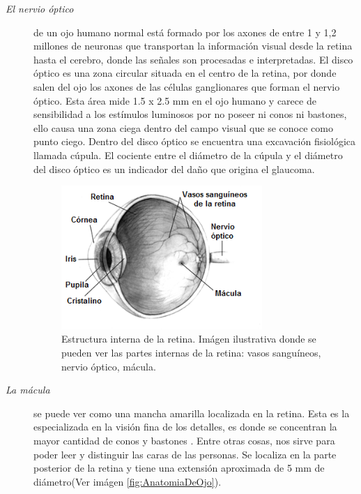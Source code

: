 \begin{description}
\item [\normalfont\textit{El nervio \'optico}] de un ojo humano normal est\'a formado por los axones de entre 1 y 1,2 millones de neuronas que transportan la informaci\'on visual desde la retina hasta el cerebro, donde las señales son procesadas e interpretadas. 
El disco \'optico es una zona circular situada en el centro de la retina, por donde salen del ojo los axones de las c\'elulas ganglionares que forman el nervio \'optico. Esta \'area mide 1.5 x 2.5 mm en el ojo humano y carece de sensibilidad a los est\'imulos luminosos por no poseer ni conos ni bastones, ello causa una zona ciega dentro del campo visual que se conoce como punto ciego. Dentro del disco \'optico se encuentra una excavaci\'on fisiol\'ogica llamada c\'upula. El cociente entre el di\'ametro de la c\'upula y el di\'ametro del disco \'optico es un indicador del daño que origina el glaucoma.\cite{li2004automated} \cite{hoover2003locating}
\begin{figure}[H]
	{
	\centering
	\includegraphics[width=0.75\textwidth]{Figures/retinaInterna}
	\caption[Estructura interna de la retina]{Estructura interna de la retina. Im\'agen ilustrativa donde se pueden ver las partes internas de la retina: vasos sangu\'ineos, nervio \'optico, m\'acula.}
	\label{fig:EstrucInternaRetina}
	}
\end{figure}	
\item [\normalfont\textit{La m\'acula}] se puede ver como una mancha amarilla localizada en la retina. Esta es la especializada en la visi\'on fina de los detalles, es donde se concentran la mayor cantidad de conos y bastones \cite{li2004automated} \cite{ibanez1999bayesian} \cite{sinthanayothin1999automated}. Entre otras cosas, nos sirve para poder leer y distinguir las caras de las personas. Se localiza en la parte posterior de la retina y tiene una extensi\'on aproximada de 5 mm de di\'ametro(Ver im\'agen \ref{fig:AnatomiaDeOjo}).

\end{description}
